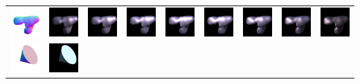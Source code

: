 \begin{center}
\begin{longtable}{@{}c@{}c@{}c@{}c@{}c@{}c@{}c@{}c@{}c@{}}
\includegraphics[width=0.1\linewidth]{training/20_gt.png} & \includegraphics[width=0.1\linewidth]{training/20_0.png} &
\includegraphics[width=0.1\linewidth]{training/20_1.png} & \includegraphics[width=0.1\linewidth]{training/20_2.png} &
\includegraphics[width=0.1\linewidth]{training/20_3.png} & \includegraphics[width=0.1\linewidth]{training/20_4.png} &
\includegraphics[width=0.1\linewidth]{training/20_5.png} & \includegraphics[width=0.1\linewidth]{training/20_6.png} &
\includegraphics[width=0.1\linewidth]{training/20_7.png} \\
\includegraphics[width=0.1\linewidth]{training/21_gt.png} & \includegraphics[width=0.1\linewidth]{training/21_0.png} &

\end{longtable}
\end{center}
